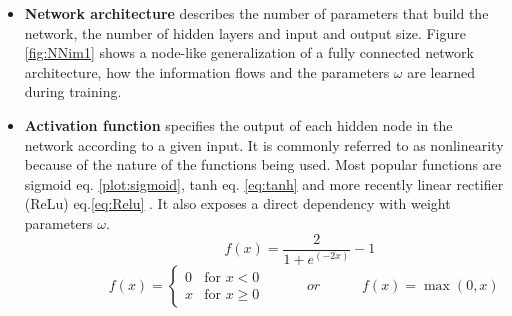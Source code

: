 \begin{itemize}
\item \textbf{Network architecture} describes the number of parameters that build the network, the number of hidden layers and input and output size. Figure \ref{fig:NNim1} shows a node-like generalization of a  fully connected network architecture, how the information flows and the parameters $\omega$ are learned during training.    

\item \textbf{Activation function} specifies the output of each hidden node in the network according to a given input. It is commonly referred to as nonlinearity because of the nature of the functions being used. Most popular functions are sigmoid eq. \ref{plot:sigmoid}, tanh eq. \ref{eq:tanh} and more recently linear rectifier (ReLu) eq.\ref{eq:Relu} \cite{glorot2011deep}. It also exposes a direct dependency with weight parameters $\omega$. 
\begin{equation} \label{eq:tanh}
\hspace{3em} \hspace{3em} \hspace{3em} f (x) = \frac{2}{1+e^{(-2x)}}-1 \enspace \enspace \hspace{3em}
\end{equation} 
\begin{equation} \label{eq:Relu}
\hspace{3em} \hspace{3em} f (x) = \begin{cases} 0 & \text{for } x < 0 \\ x & \text{for } x \geqslant 0    \end{cases} \hspace{3em} or \hspace{3em} f (x) = \max (0,x) \hspace{3em}
\end{equation} 

\begin{center}
\end{center}



\end{itemize}
